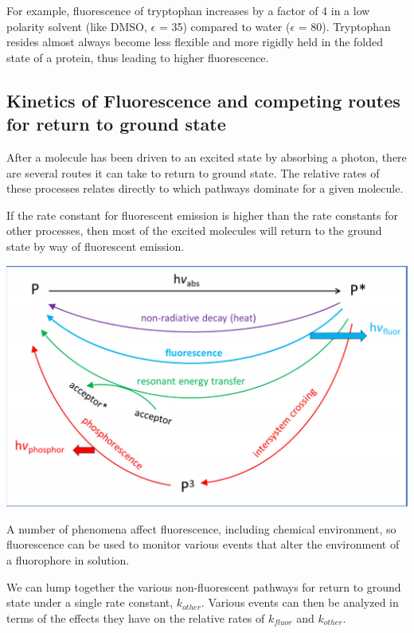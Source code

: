 \documentclass[12pt, letterpaper]{article}
\begin{document}
For example, fluorescence of tryptophan increases by a factor of 4 in a low polarity solvent (like DMSO, $\epsilon$ = 35) compared to water ($\epsilon$ = 80). 
Tryptophan resides almost always become less flexible and more rigidly held in the folded state of a protein, thus leading to higher fluorescence. 

\newpage

\subsection*{Kinetics of Fluorescence and competing routes for return to ground state}

 After a molecule has been driven to an excited state by absorbing a photon, there are several 
 routes it can take to return to ground state. The relative rates of these processes relates directly to which 
 pathways dominate for a given molecule. 

 If the rate constant for fluorescent emission is higher than the rate constants for other processes, then most 
 of the excited molecules will return to the ground state by way of fluorescent emission. 

 \begin{center}
    \includegraphics[scale = 0.5]{ground states.png}
 \end{center}

 A number of phenomena affect fluorescence, including chemical environment, so fluorescence can be used to monitor
 various events that alter the environment of a fluorophore in solution. 

 We can lump together the various non-fluorescent pathways for return to ground state under a single rate constant, \textbf{$k_{other}$}. 
 Various events can then be analyzed in terms of the effects they have on the relative rates of $k_{fluor}$ and $k_{other}$. 
\end{document}
